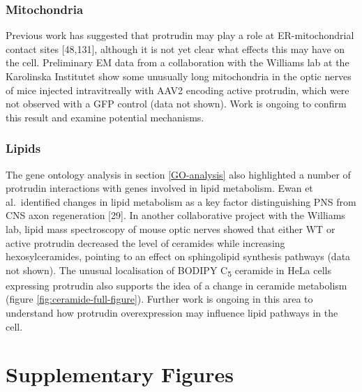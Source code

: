 \documentclass[
  12pt,
  a4paper,
]{book}
\begin{document}
\hypertarget{mitochondria-1}{%
\subsection{Mitochondria}\label{mitochondria-1}}

Previous work has suggested that protrudin may play a role at ER-mitochondrial contact sites {[}48,131{]}, although it is not yet clear what effects this may have on the cell. Preliminary EM data from a collaboration with the Williams lab at the Karolinska Institutet show some unusually long mitochondria in the optic nerves of mice injected intravitreally with AAV2 encoding active protrudin, which were not observed with a GFP control (data not shown). Work is ongoing to confirm this result and examine potential mechanisms.

\hypertarget{lipids}{%
\subsection{Lipids}\label{lipids}}

The gene ontology analysis in section \ref{GO-analysis} also highlighted a number of protrudin interactions with genes involved in lipid metabolism. Ewan et al.~identified changes in lipid metabolism as a key factor distinguishing PNS from CNS axon regeneration {[}29{]}. In another collaborative project with the Williams lab, lipid mass spectroscopy of mouse optic nerves showed that either WT or active protrudin decreased the level of ceramides while increasing hexosylceramides, pointing to an effect on sphingolipid synthesis pathways (data not shown). The unusual localisation of BODIPY C\textsubscript{5} ceramide in HeLa cells expressing protrudin also supports the idea of a change in ceramide metabolism (figure \ref{fig:ceramide-full-figure}). Further work is ongoing in this area to understand how protrudin overexpression may influence lipid pathways in the cell.

\hypertarget{SUPPLEMENT}{%
\chapter*{Supplementary Figures}\label{SUPPLEMENT}}

\end{document}
